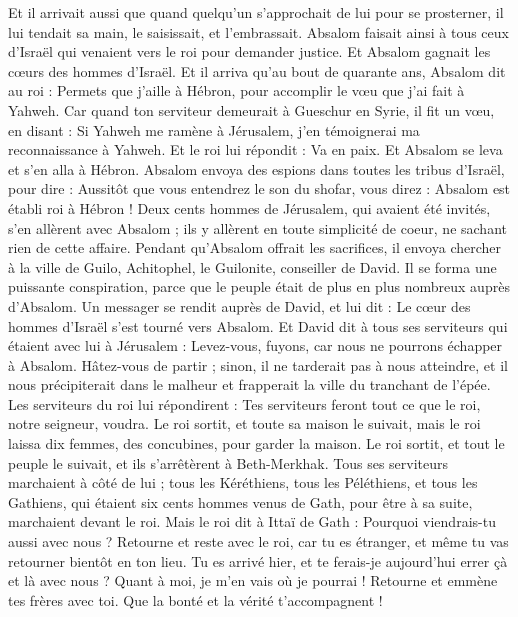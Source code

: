 \begin{multicols}{2}
Et il arrivait aussi que quand quelqu'un s'approchait de lui pour se prosterner, il lui tendait sa main, le saisissait, et l'embrassait.
Absalom faisait ainsi à tous ceux d'Israël qui venaient vers le roi pour demander justice. Et Absalom gagnait les cœurs des hommes d'Israël.
Et il arriva qu'au bout de quarante ans, Absalom dit au roi : Permets que j'aille à Hébron, pour accomplir le vœu que j'ai fait à Yahweh.
Car quand ton serviteur demeurait à Gueschur en Syrie, il fit un vœu, en disant : Si Yahweh me ramène à Jérusalem, j'en témoignerai ma reconnaissance à Yahweh.
Et le roi lui répondit : Va en paix. Et Absalom se leva et s'en alla à Hébron.
Absalom envoya des espions dans toutes les tribus d'Israël, pour dire : Aussitôt que vous entendrez le son du shofar, vous direz : Absalom est établi roi à Hébron !
Deux cents hommes de Jérusalem, qui avaient été invités, s'en allèrent avec Absalom ; ils y allèrent en toute simplicité de coeur, ne sachant rien de cette affaire.
Pendant qu'Absalom offrait les sacrifices, il envoya chercher à la ville de Guilo, Achitophel, le Guilonite, conseiller de David. Il se forma une puissante conspiration, parce que le peuple était de plus en plus nombreux auprès d'Absalom.
Un messager se rendit auprès de David, et lui dit : Le cœur des hommes d'Israël s'est tourné vers Absalom.
Et David dit à tous ses serviteurs qui étaient avec lui à Jérusalem : Levez-vous, fuyons, car nous ne pourrons échapper à Absalom. Hâtez-vous de partir ; sinon, il ne tarderait pas à nous atteindre, et il nous précipiterait dans le malheur et frapperait la ville du tranchant de l'épée.
Les serviteurs du roi lui répondirent : Tes serviteurs feront tout ce que le roi, notre seigneur, voudra.
Le roi sortit, et toute sa maison le suivait, mais le roi laissa dix femmes, des concubines, pour garder la maison.
Le roi sortit, et tout le peuple le suivait, et ils s'arrêtèrent à Beth-Merkhak.
Tous ses serviteurs marchaient à côté de lui ; tous les Kéréthiens, tous les Péléthiens, et tous les Gathiens, qui étaient six cents hommes venus de Gath, pour être à sa suite, marchaient devant le roi.
Mais le roi dit à Ittaï de Gath : Pourquoi viendrais-tu aussi avec nous ? Retourne et reste avec le roi, car tu es étranger, et même tu vas retourner bientôt en ton lieu.
Tu es arrivé hier, et te ferais-je aujourd'hui errer çà et là avec nous ? Quant à moi, je m'en vais où je pourrai ! Retourne et emmène tes frères avec toi. Que la bonté et la vérité t'accompagnent !

\end{multicols}
